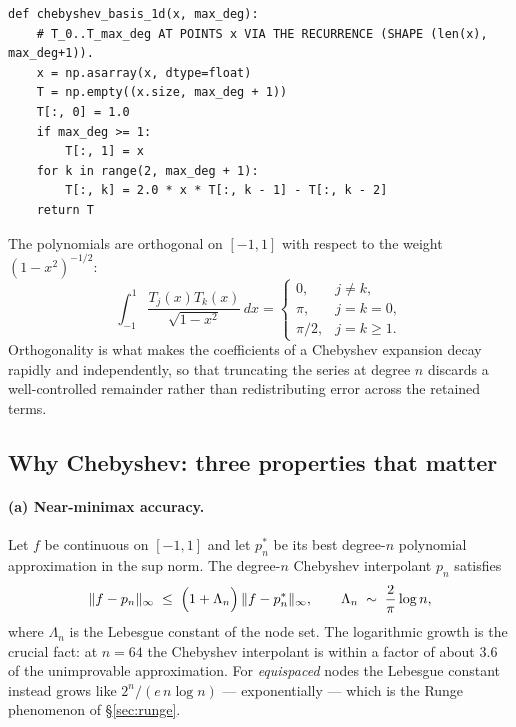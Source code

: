 \documentclass[11pt]{article}
\numberwithin{equation}{section}
\newcommand{\code}[1]{\texttt{\small #1}}
\theoremstyle{definition}
\theoremstyle{plain}
\theoremstyle{remark}
\begin{document}
\begin{lstlisting}[caption={The Chebyshev recurrence. \code{state\_grid.py}, \code{chebyshev\_basis\_1d}.}]
def chebyshev_basis_1d(x, max_deg):
    # T_0..T_max_deg AT POINTS x VIA THE RECURRENCE (SHAPE (len(x), max_deg+1)).
    x = np.asarray(x, dtype=float)
    T = np.empty((x.size, max_deg + 1))
    T[:, 0] = 1.0
    if max_deg >= 1:
        T[:, 1] = x
    for k in range(2, max_deg + 1):
        T[:, k] = 2.0 * x * T[:, k - 1] - T[:, k - 2]
    return T
\end{lstlisting}

The polynomials are orthogonal on $[-1,1]$ with respect to the weight
$(1-x^{2})^{-1/2}$:
\begin{equation}
\int_{-1}^{1}\frac{T_j(x)T_k(x)}{\sqrt{1-x^{2}}}\,dx
=\begin{cases}
0, & j\ne k,\\
\pi, & j=k=0,\\
\pi/2, & j=k\ge1 .
\end{cases}
\label{eq:cheb-orthogonality}
\end{equation}
Orthogonality is what makes the coefficients of a Chebyshev expansion decay rapidly
and independently, so that truncating the series at degree $n$ discards a
well-controlled remainder rather than redistributing error across the retained terms.

\subsection{Why Chebyshev: three properties that matter}

\paragraph{(a) Near-minimax accuracy.} Let $f$ be continuous on $[-1,1]$ and let
$p^{\ast}_n$ be its best degree-$n$ polynomial approximation in the sup norm. The
degree-$n$ Chebyshev interpolant $p_n$ satisfies
\begin{equation}
\|f-p_n\|_{\infty}\;\le\;\Bigl(1+\Lambda_n\Bigr)\,\|f-p^{\ast}_n\|_{\infty},
\qquad
\Lambda_n\;\sim\;\frac{2}{\pi}\log n ,
\label{eq:lebesgue}
\end{equation}
where $\Lambda_n$ is the Lebesgue constant of the node set. The logarithmic growth is
the crucial fact: at $n=64$ the Chebyshev interpolant is within a factor of about
$3.6$ of the unimprovable approximation. For \emph{equispaced} nodes the Lebesgue
constant instead grows like $2^{n}/(e\,n\log n)$ --- exponentially --- which is the
Runge phenomenon of \S\ref{sec:runge}.
\end{document}
